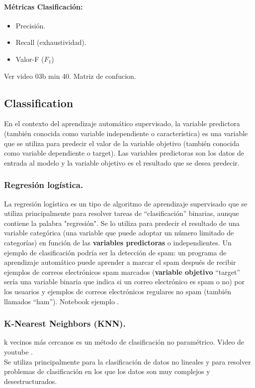 \documentclass[../main.tex]{subfiles}
\begin{document}
    
    \paragraph{Métricas Clasificación:}
        \begin{itemize}
            \item Precisión.
            \item Recall (exhaustividad).
            \item Valor-F ($F_1$)
        \end{itemize}
        
        Ver video 03b min 40. Matriz de confucion.

    \subsection{Classification}
        En el contexto del aprendizaje automático supervisado, la variable predictora (también conocida como variable independiente o característica) es una variable que se utiliza para predecir el valor de la variable objetivo (también conocida como variable dependiente o target). Las variables predictoras son los datos de entrada al modelo y la variable objetivo es el resultado que se desea predecir.
        
        \subsubsection{Regresión logística.}
            La regresión logística es un tipo de algoritmo de aprendizaje supervisado que se utiliza principalmente para resolver tareas de “clasificación” binarias, aunque contiene la palabra "regresión". Se lo utiliza para predecir el resultado de una variable categórica (una variable que puede adoptar un número limitado de categorías) en función de las \textbf{variables predictoras} o independientes. Un ejemplo de clasificación podría ser la detección de spam: un programa de aprendizaje automático puede aprender a marcar el spam después de recibir ejemplos de correos electrónicos spam marcados (\textbf{variable objetivo} “target” sería una variable binaria que indica si un correo electrónico es spam o no) por los usuarios y ejemplos de correos electrónicos regulares no spam (también llamados “ham”). Notebook ejemplo \cite{regresión_logística_colab}.

        \subsubsection{K-Nearest Neighbors (KNN).}
            k vecinos más cercanos es un método de clasificación no paramétrico. Video de youtube \cite{knn_you_tube}.\\
            Se utiliza principalmente para la clasificación de datos no lineales y para resolver problemas de clasificación en los que los datos son muy complejos y desestructurados.\\
            
\end{document}
